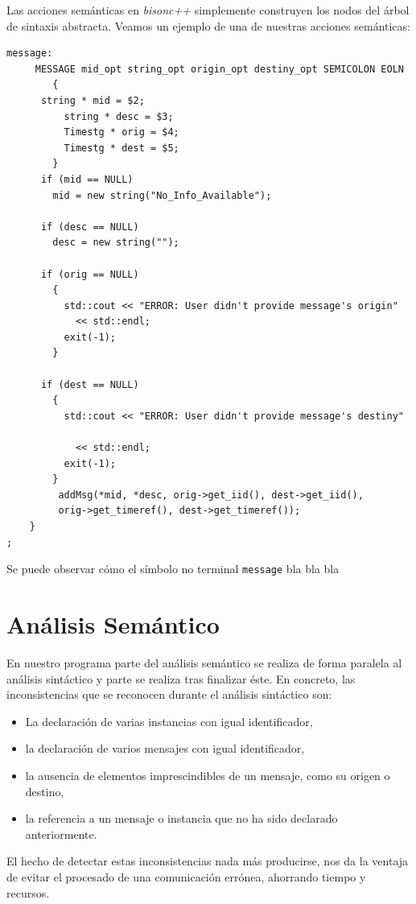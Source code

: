Las acciones semánticas en \emph{bisonc++} simplemente construyen los
nodos del árbol de sintaxis abstracta. Veamos un ejemplo de una de
nuestras acciones semánticas: 
{}
\begin{lstlisting}
message:
     MESSAGE mid_opt string_opt origin_opt destiny_opt SEMICOLON EOLN
        { 
	  string * mid = $2;
          string * desc = $3;
          Timestg * orig = $4;
          Timestg * dest = $5;
        }
	  if (mid == NULL)
	    mid = new string("No_Info_Available");

	  if (desc == NULL)
	    desc = new string("");

	  if (orig == NULL)
	    {
	      std::cout << "ERROR: User didn't provide message's origin" 
			<< std::endl;
	      exit(-1);
	    }

	  if (dest == NULL)
	    {
	      std::cout << "ERROR: User didn't provide message's destiny" 

			<< std::endl;
	      exit(-1);
	    }
	     addMsg(*mid, *desc, orig->get_iid(), dest->get_iid(), 
		 orig->get_timeref(), dest->get_timeref());
	}
;
\end{lstlisting}

Se puede observar cómo el símbolo no terminal \lstinline{message} bla bla bla

\section{Análisis Semántico}

En nuestro programa parte del análisis semántico se realiza de forma
paralela al análisis sintáctico y parte se realiza tras finalizar
éste. En concreto, las inconsistencias que se reconocen durante el
análisis sintáctico son:
\begin{itemize}
\item La declaración de varias instancias con igual identificador,
\item la declaración de varios mensajes con igual identificador,
\item la ausencia de elementos imprescindibles de un mensaje, como su
  origen o destino,
\item la referencia a un mensaje o instancia que no ha sido declarado
  anteriormente.
\end{itemize}

El hecho de detectar estas inconsistencias nada más producirse, nos da
la ventaja de evitar el procesado de una comunicación errónea,
ahorrando tiempo y recursos.

